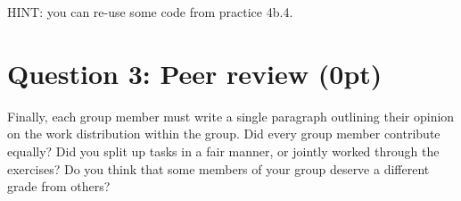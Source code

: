 \documentclass[a4paper,twoside,10pt]{article}
\begin{document}
	HINT: you can re-use some code from practice 4b.4.
	
	\section*{Question 3:  Peer review (0pt)}
	Finally, each group member must write a single paragraph outlining their opinion on the work distribution within the group. Did every group member contribute equally? Did you split up tasks in a fair manner, or jointly worked through the exercises? Do you think that some members of your group deserve a different grade from others?
	
	
\end{document}
